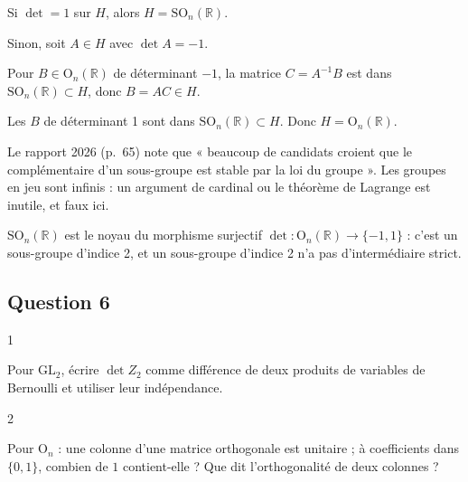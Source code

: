 \documentclass[11pt,a4paper]{article}
\newcommand{\equationajustee}[1]{%
  \sbox{\boiteequation}{$\displaystyle #1$}%
  \ifdim\wd\boiteequation>\linewidth
    \[\resizebox{\linewidth}{!}{\usebox{\boiteequation}}\]%
  \else
    \[#1\]%
  \fi}
\begin{document}
Si \(\det=1\) sur \(H\), alors \(H={\mathrm{SO}}_n(\mathbb R)\).

Sinon, soit \(A\in H\) avec \(\det A=-1\).

Pour \(B\in{\mathrm{O}}_n(\mathbb R)\) de déterminant \(-1\), la matrice \(C=A^{-1}B\) est dans \({\mathrm{SO}}_n(\mathbb R)\subset H\), donc \(B=AC\in H\).

Les \(B\) de déterminant 1 sont dans \({\mathrm{SO}}_n(\mathbb R)\subset H\). Donc \(H={\mathrm{O}}_n(\mathbb R)\).

\equationajustee{\boxed{H={\mathrm{SO}}_n(\mathbb R)\ \text{ou}\ H={\mathrm{O}}_n(\mathbb R)}}

\begin{piege}

Le rapport 2026 (p.~65) note que « beaucoup de candidats croient que le complémentaire d'un sous-groupe est stable par la loi du groupe ». Les groupes en jeu sont infinis : un argument de cardinal ou le théorème de Lagrange est inutile, et faux ici.

\end{piege}

\begin{methode}

\({\mathrm{SO}}_n(\mathbb R)\) est le noyau du morphisme surjectif \(\det:{\mathrm{O}}_n(\mathbb R)\to\{-1,1\}\) : c'est un sous-groupe d'indice 2, et un sous-groupe d'indice 2 n'a pas d'intermédiaire strict.

\end{methode}

\hypertarget{question-6}{%
\subsection{Question 6}\label{question-6}}

\begin{indication}{1}

Pour \({\mathrm{GL}}_2\), écrire \(\det Z_2\) comme différence de deux produits de variables de Bernoulli et utiliser leur indépendance.

\end{indication}

\begin{indication}{2}

Pour \({\mathrm{O}}_n\) : une colonne d'une matrice orthogonale est unitaire ; à coefficients dans \(\{0,1\}\), combien de \(1\) contient-elle ? Que dit l'orthogonalité de deux colonnes ?

\end{indication}
\end{document}
